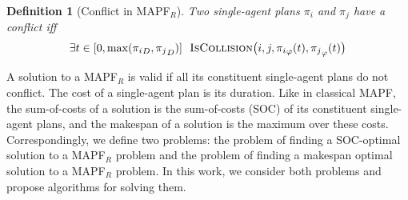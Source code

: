 \documentclass[review]{elsarticle}
\newtheorem{definition}{Definition}
\newcommand{\target}{\ensuremath{G}\xspace}
\newcommand{\source}{\ensuremath{S}\xspace}
\newcommand\konstantin[1]{\nb{\textbf{Konstantin:}}{red}{#1}}
\newcommand\roni[1]{\nb{\textbf{Roni:}}{green}{#1}}
\newcommand{\mapfr}{\ac{MAPF}$_R$\xspace}
\newcommand{\mapf}{\ac{MAPF}\xspace}
\newcommand{\coord}{\textit{coord}\xspace}
\newcommand{\iscollision}{\textsc{IsCollision}\xspace}
\begin{document}
\begin{definition}[Conflict in \mapfr]
Two single-agent plans $\pi_i$ and $\pi_j$ have a conflict iff 
\begin{equation}
    \exists t\in [0, \max({\pi_i}_D,{\pi_j}_D)] 
        ~~ \iscollision\big(i,j,{\pi_i}_\varphi(t), {\pi_j}_\varphi(t)\big)
\end{equation}
\label{def:conflict-mapfr}
\end{definition}





A solution to a \mapfr is valid if all its constituent single-agent plans do not conflict. The cost of a single-agent plan is its duration. Like in classical \mapf, the sum-of-costs of a solution is the sum-of-costs (SOC) of its constituent single-agent plans, and the makespan of a solution is the maximum over these costs. 
Correspondingly, we define two problems: 
the problem of finding a SOC-optimal solution to a \mapfr problem and the problem of finding a makespan optimal solution to a \mapfr problem. In this work, we 
consider both problems and propose algorithms for solving them. 



\end{document}
